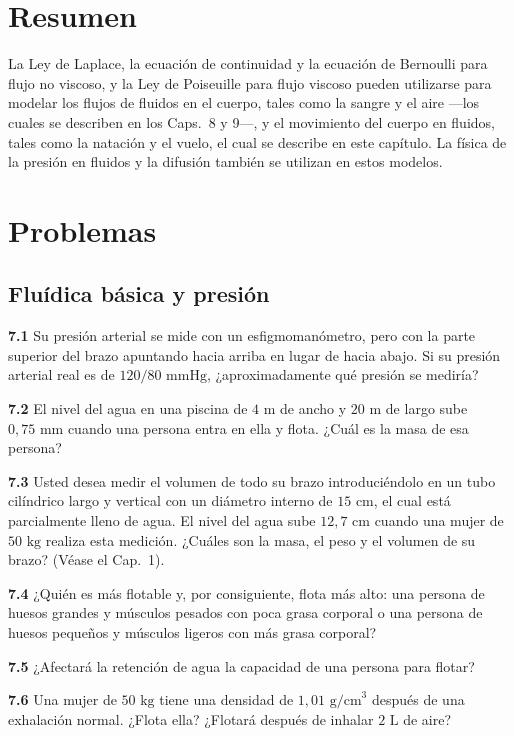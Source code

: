 \documentclass[12pt]{book}
\begin{document}
\section{Resumen}

La Ley de Laplace, la ecuación de continuidad y la ecuación de Bernoulli para flujo no viscoso, y la Ley de Poiseuille para flujo viscoso pueden utilizarse para modelar los flujos de fluidos en el cuerpo, tales como la sangre y el aire ---los cuales se describen en los Caps.~8 y 9---, y el movimiento del cuerpo en fluidos, tales como la natación y el vuelo, el cual se describe en este capítulo. La física de la presión en fluidos y la difusión también se utilizan en estos modelos.

\section*{Problemas}

\subsection*{Fluídica básica y presión}

\textbf{7.1} Su presión arterial se mide con un esfigmomanómetro, pero con la parte superior del brazo apuntando hacia arriba en lugar de hacia abajo. Si su presión arterial real es de $120/80\text{ mmHg}$, ¿aproximadamente qué presión se mediría?

\textbf{7.2} El nivel del agua en una piscina de $4\text{ m}$ de ancho y $20\text{ m}$ de largo sube $0{,}75\text{ mm}$ cuando una persona entra en ella y flota. ¿Cuál es la masa de esa persona?

\textbf{7.3} Usted desea medir el volumen de todo su brazo introduciéndolo en un tubo cilíndrico largo y vertical con un diámetro interno de $15\text{ cm}$, el cual está parcialmente lleno de agua. El nivel del agua sube $12{,}7\text{ cm}$ cuando una mujer de $50\text{ kg}$ realiza esta medición. ¿Cuáles son la masa, el peso y el volumen de su brazo? (Véase el Cap.~1).

\textbf{7.4} ¿Quién es más flotable y, por consiguiente, flota más alto: una persona de huesos grandes y músculos pesados con poca grasa corporal o una persona de huesos pequeños y músculos ligeros con más grasa corporal?

\textbf{7.5} ¿Afectará la retención de agua la capacidad de una persona para flotar?

\textbf{7.6} Una mujer de $50\text{ kg}$ tiene una densidad de $1{,}01\text{ g/cm}^3$ después de una exhalación normal. ¿Flota ella? ¿Flotará después de inhalar $2\text{ L}$ de aire?
\end{document}
